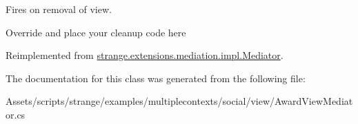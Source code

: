 Fires on removal of view. 

Override and place your cleanup code here 

Reimplemented from \hyperlink{classstrange_1_1extensions_1_1mediation_1_1impl_1_1_mediator_a9c65534ae8c37db9f4db7c84a94cd635}{strange.\-extensions.\-mediation.\-impl.\-Mediator}.



The documentation for this class was generated from the following file\-:\begin{DoxyCompactItemize}
\item 
Assets/scripts/strange/examples/multiplecontexts/social/view/Award\-View\-Mediator.\-cs\end{DoxyCompactItemize}
